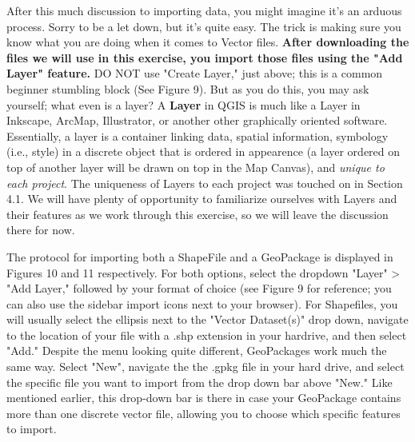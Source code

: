\documentclass{article}
\begin{document}
After this much discussion to importing data, you might imagine it's an arduous process. Sorry to be a let down, but it's quite easy. The trick is making sure you know what you are doing when it comes to Vector files. \textbf{After downloading the files we will use in this exercise, you import those files using the "Add Layer" feature.} DO NOT use "Create Layer," just above; this is a common beginner stumbling block (See Figure 9). But as you do this, you may ask yourself; what even is a layer? A \textbf{Layer} in QGIS is much like a Layer in Inkscape, ArcMap, Illustrator, or another other graphically oriented software. Essentially, a layer is a container linking data, spatial information, symbology (i.e., style) in a discrete object that is ordered in appearence (a layer ordered on top of another layer will be drawn on top in the Map Canvas), and \textit{unique to each project}. The uniqueness of Layers to each project was touched on in Section 4.1. We will have plenty of opportunity to familiarize ourselves with Layers and their features as we work through this exercise, so we will leave the discussion there for now. 

The protocol for importing both a ShapeFile and a GeoPackage is displayed in Figures 10 and 11 respectively. For both options, select the dropdown "Layer" > "Add Layer," followed by your format of choice (see Figure 9 for reference; you can also use the sidebar import icons next to your browser). For Shapefiles, you will usually select the ellipsis next to the "Vector Dataset(s)" drop down, navigate to the location of your file with a .shp extension in your hardrive, and then select "Add." Despite the menu looking quite different, GeoPackages work much the same way. Select "New", navigate the the .gpkg file in your hard drive, and select the specific file you want to import from the drop down bar above "New." Like mentioned earlier, this drop-down bar is there in case your GeoPackage contains more than one discrete vector file, allowing you to choose which specific features to import. 
\end{document}
